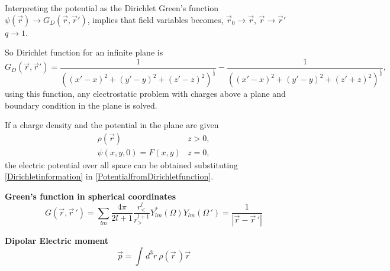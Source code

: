 \documentclass[12pt,a4paper]{article}
\newcommand{\integral}[3]{\int_{#1}^{#2} d #3 \ } %
\begin{document}
Interpreting the potential as the Dirichlet Green's function $\psi(\vec{r})\rightarrow G_{D}(\vec{r},\vec{r}')$, implies that field variables becomes, $\vec{r}_{0}\rightarrow\vec{r}$, $\vec{r}\rightarrow\vec{r}'$ $q\rightarrow1$. 

So Dirichlet function for an infinite plane is
\begin{equation}
G_{D}(\vec{r},\vec{r}')=\frac{1}{((x'-x)^{2}+(y'-y)^{2}+(z'-z)^{2})^{\frac{1}{2}}}-\frac{1}{((x'-x)^{2}+(y'-y)^{2}+(z'+z)^{2})^{\frac{1}{2}}},
\end{equation}
using this function, any electrostatic problem with charges above a plane and boundary condition in the plane is solved.

If a charge density and the potential in the plane are given
\begin{equation}
	\label{Dirichletinformation}
\begin{array}{cc}
\rho (\vec{r}) & z>0, \\
\psi (x,y,0)=F(x,y) & z=0,
\end{array}
\end{equation}
the electric potential over all space can be obtained substituting \eqref{Dirichletinformation} in \eqref{PotentialfromDirichletfunction}.

\textbf{Green's function in spherical coordinates}\\
\begin{equation}
	G(\vec{r},\vec{r}\,') = \sum_{lm}\frac{4\pi}{2l+1} \frac{r_<^l}{r_>^{l+1}} Y_{lm}^*(\Omega)Y_{lm}(\Omega\,') = \frac{1}{|\vec{r}-\vec{r}\,'|}
\end{equation}

\textbf{Dipolar Electric moment}\\
\begin{equation}
	\vec{p} = \integral{}{}{^3r} \rho (\vec{r}\,)\vec{r}
\end{equation}
\end{document}
